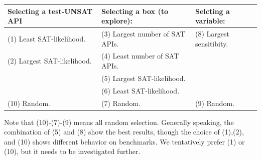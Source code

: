 \documentclass[runningheads,a4paper,oribibl]{llncs}
\begin{document}
\medskip
{\centering
\begin{tabular}{l|l|l}
Selecting a test-UNSAT API~~ & Selecting a box (to explore): & 
Selcting a variable: \\  %
\hline

(1) Least SAT-likelihood. & 
(3) Largest number of SAT APIs.~~ & 
(8) Largest sensitibity. \\

(2) Largest SAT-likelihood. & 
(4) Least number of SAT APIs. & \\

& (5) Largest SAT-likelihood. & \\

& (6) Least SAT-likelihood. & \\

(10) Random. & (7) Random. & (9) Random. \\
\end{tabular}
}
\medskip

Note that (10)-(7)-(9) means all random selection. 
Generally speaking, the combination of (5) and (8) show the best results, 
though the choice of (1),(2), and (10) shows different behavior on benchmarks. 
We tentatively prefer (1) or (10), but it needs to be investigated further. 
\end{document}
